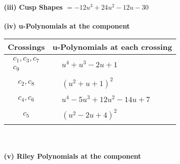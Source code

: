 \documentclass[1p]{elsarticle_modified}
\theoremstyle{definition}
\begin{document}
\flushleft \textbf{(iii) Cusp Shapes $= -12 u^3+24 u^2-12 u-30$}\\~\\
\newpage\renewcommand{\arraystretch}{1}
\flushleft \textbf{(iv) u-Polynomials at the component}\newline \\
\begin{tabular}{m{50pt}|m{274pt}}
Crossings & \hspace{64pt}u-Polynomials at each crossing \\
\hline $$\begin{aligned}c_{1},c_{3},c_{7}\\c_{9}\end{aligned}$$&$\begin{aligned}
&u^4+u^3-2 u+1
\end{aligned}$\\
\hline $$\begin{aligned}c_{2},c_{8}\end{aligned}$$&$\begin{aligned}
&(u^2+u+1)^2
\end{aligned}$\\
\hline $$\begin{aligned}c_{4},c_{6}\end{aligned}$$&$\begin{aligned}
&u^4-5 u^3+12 u^2-14 u+7
\end{aligned}$\\
\hline $$\begin{aligned}c_{5}\end{aligned}$$&$\begin{aligned}
&(u^2-2 u+4)^2
\end{aligned}$\\
\hline
\end{tabular}\\~\\
\newpage\renewcommand{\arraystretch}{1}
\flushleft \textbf{(v) Riley Polynomials at the component}\newline \\
\end{document}
